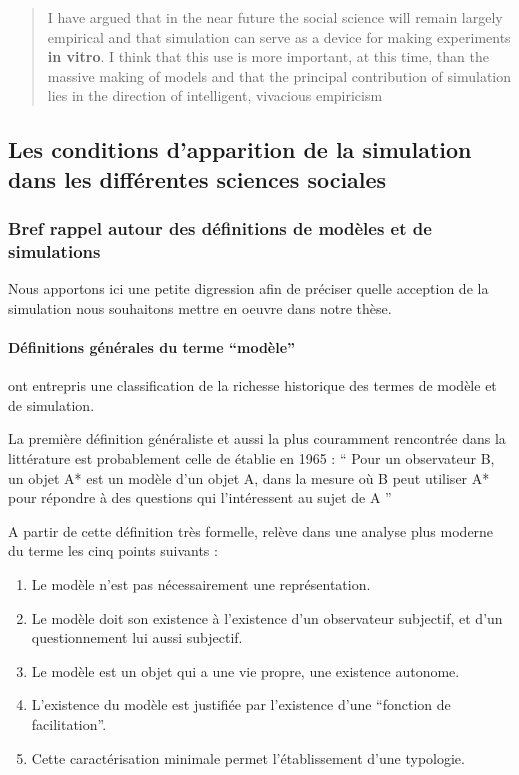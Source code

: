 \foreignblockquote{english}[\cite{Fleisher1965}]{I have argued that in the near future the social science will remain largely empirical and that simulation can serve as a device for making experiments \textbf{in vitro}. I think that this use is more important, at this time, than the massive making of models and that the principal contribution of simulation lies in the direction of intelligent, vivacious empiricism}


\subsection{Les conditions d'apparition de la simulation dans les différentes sciences sociales }
\label{sec:apparition_simu_science_sociales}

\subsubsection{Bref rappel autour des définitions de modèles et de simulations}
\label{ssec:rapell_termes_generiques}

Nous apportons ici une petite digression afin de préciser quelle acception de la simulation nous souhaitons mettre en oeuvre dans notre thèse.

\paragraph{Définitions générales du terme \enquote{modèle}}

\textcite{Varenne2013} ont entrepris une classification de la richesse historique des termes de modèle et de simulation.

La première définition généraliste et aussi la plus couramment rencontrée dans la littérature est probablement celle de \textcite{Minsky1965} établie en 1965 : \enquote{ Pour un observateur B, un objet A* est un modèle d’un objet A, dans la mesure où B peut utiliser A* pour répondre à des questions qui l’intéressent au sujet de A } \autocites{Varenne2008}[15]{Varenne2013b}

A partir de cette définition très formelle, \textcite{Varenne2008} relève dans une analyse plus moderne du terme les cinq points suivants :
\begin{enumerate}
  \item Le modèle n'est pas nécessairement une représentation.
  \item Le modèle doit son existence à l'existence d'un observateur subjectif, et d'un questionnement lui aussi subjectif.
  \item Le modèle est un objet qui a une vie propre, une existence autonome.
  \item L'existence du modèle est justifiée par l'existence d'une \enquote{fonction de facilitation}.
  \item Cette caractérisation minimale permet l'établissement d'une typologie.
\end{enumerate}

